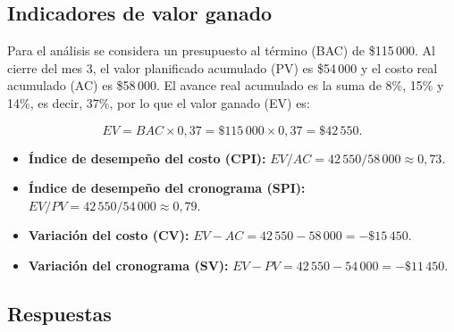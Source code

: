 \documentclass[12pt,letterpaper]{article}
\begin{document}
\subsection*{Indicadores de valor ganado}

Para el análisis se considera un presupuesto al término (BAC) de \$115\,000.
Al cierre del mes 3, el valor planificado acumulado (PV) es \$54\,000 y el
costo real acumulado (AC) es \$58\,000. El avance real acumulado es la suma
de 8\%, 15\% y 14\%, es decir, 37\%, por lo que el valor ganado (EV) es:

\[
EV = BAC \times 0{,}37 = \$115\,000 \times 0{,}37 = \$42\,550.
\]

\begin{itemize}
  \item \textbf{Índice de desempeño del costo (CPI):}
  $EV/AC = 42\,550/58\,000 \approx 0{,}73$.
  \item \textbf{Índice de desempeño del cronograma (SPI):}
  $EV/PV = 42\,550/54\,000 \approx 0{,}79$.
  \item \textbf{Variación del costo (CV):}
  $EV-AC = 42\,550-58\,000 = -\$15\,450$.
  \item \textbf{Variación del cronograma (SV):}
  $EV-PV = 42\,550-54\,000 = -\$11\,450$.
\end{itemize}

\subsection*{Respuestas}
\end{document}
